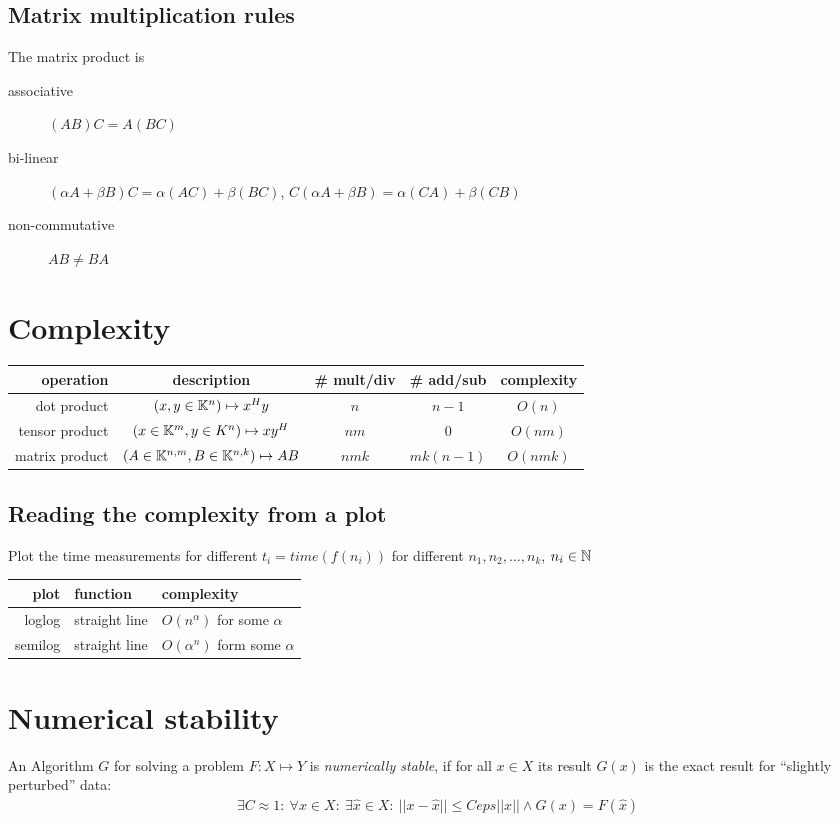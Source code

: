 		\subsection{Matrix multiplication rules}
			The matrix product is
			\begin{description}
			 \item[associative] $(AB)C = A(BC)$
			 \item[bi-linear] $(\alpha A+\beta B)C = \alpha(AC) + \beta(BC)$, $C(\alpha A +\beta B) = \alpha(CA)+\beta(CB)$
			 \item[non-commutative] $AB \neq BA$ 
			\end{description}
	\section{Complexity}
		\begin{center}
			\begin{tabular}{r|c|c|c|c}
				operation			& description						& \# mult/div & \# add/sub	& complexity\\ \hline
				dot product			& $(x, y \in \mathbb{K}^n) \mapsto x^H y$	& $n$		 & $n-1$		& $O(n)$\\
				tensor product		& $(x \in \mathbb{K}^m, y\in K^n) \mapsto xy^H$& $nm$	 & $0$			& $O(nm)$\\
				matrix product		& $(A \in \mathbb{K}^{n,m}, B \in \mathbb{K}^{n,k}) \mapsto AB$& $nmk$&$mk(n-1)$& $O(nmk)$
			\end{tabular}
		\end{center}
		\subsection{Reading the complexity from a plot}
		Plot the time measurements for different $t_i = time(f(n_i))$ for different $n_1, n_2, \ldots, n_k$, $n_i \in \mathbb{N}$
		
		\begin{center}
			\begin{tabular}{r|ll}
				plot		& function		& complexity\\ \hline
				loglog		& straight line	& $O(n^\alpha)$ for some $\alpha$\\
				semilog		& straight line & $O(\alpha^n)$ form some $\alpha$
			\end{tabular}
		\end{center}

\section{Numerical stability}
	\begin{definition}
		An Algorithm $G$ for solving a problem $F: X\mapsto Y$ is \emph{numerically stable}, if for all $x\in X$ its result $G(x)$ is the exact result for ``slightly perturbed'' data:
		\begin{align*}
		 \exists C \approx 1:\ \forall x \in X:\ \exists \hat{x} \in X: \ ||x- \hat x || \leq C eps||x|| \land G(x) = F(\hat x)
		\end{align*}

	\end{definition}